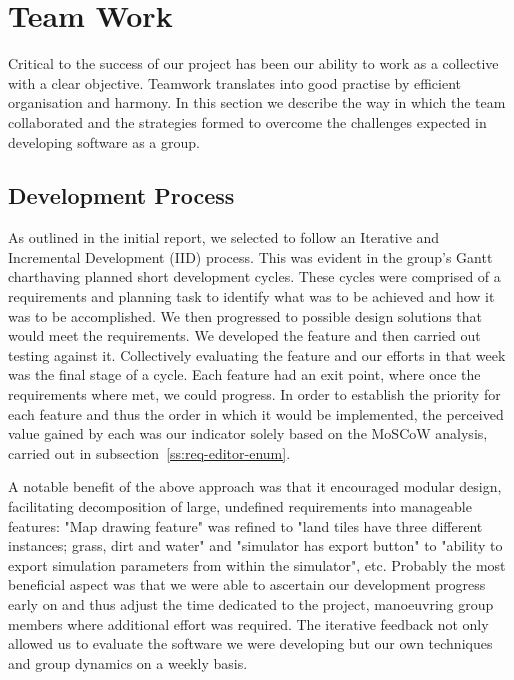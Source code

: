 \section{Team Work}
\label{sec:team_work}
Critical to the success of our project has been our ability to work as a collective with a clear objective. Teamwork translates into good practise by efficient organisation and harmony. In this section we describe the way in which the team collaborated and the strategies formed to overcome the challenges expected in developing software as a group.

\subsection{Development Process}\label{ss:dev-process}
As outlined in the initial report, we selected to follow an Iterative and Incremental Development (IID) process. This was evident in the group's Gantt chart\footnotemark[01] having planned short development cycles. These cycles were comprised of a requirements and planning task to identify what was to be achieved and how it was to be accomplished. We then progressed to possible design solutions that would meet the requirements. We developed the feature and then carried out testing against it. Collectively evaluating the feature and our efforts in that week was the final stage of a cycle. Each feature had an exit point, where once the requirements where met, we could progress. In order to establish the priority for each feature and thus the order in which it would be implemented, the perceived value gained by each was our indicator solely based on the MoSCoW analysis, carried out in subsection~\ref{ss:req-editor-enum}.

A notable benefit of the above approach was that it encouraged modular design, facilitating decomposition of large, undefined requirements into manageable features: "Map drawing feature" was refined to "land tiles have three different instances; grass, dirt and water" and "simulator has export button" to "ability to export simulation parameters from within the simulator", etc.  
Probably the most beneficial aspect was that we were able to ascertain our development progress early on and thus adjust the time dedicated to the project, manoeuvring group members where additional effort was required. The iterative feedback not only allowed us to evaluate the software we were developing but our own techniques and group dynamics on a weekly basis.

